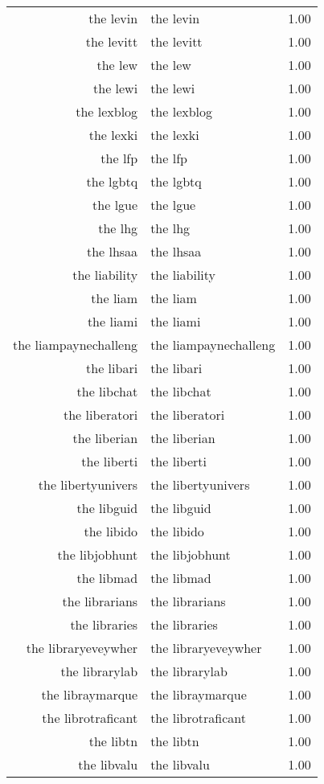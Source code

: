 \begin{table}[ht]
\begin{tabular}{rlr}
  the levin & the levin & 1.00 \\ 
  the levitt & the levitt & 1.00 \\ 
  the lew & the lew & 1.00 \\ 
  the lewi & the lewi & 1.00 \\ 
  the lexblog & the lexblog & 1.00 \\ 
  the lexki & the lexki & 1.00 \\ 
  the lfp & the lfp & 1.00 \\ 
  the lgbtq & the lgbtq & 1.00 \\ 
  the lgue & the lgue & 1.00 \\ 
  the lhg & the lhg & 1.00 \\ 
  the lhsaa & the lhsaa & 1.00 \\ 
  the liability & the liability & 1.00 \\ 
  the liam & the liam & 1.00 \\ 
  the liami & the liami & 1.00 \\ 
  the liampaynechalleng & the liampaynechalleng & 1.00 \\ 
  the libari & the libari & 1.00 \\ 
  the libchat & the libchat & 1.00 \\ 
  the liberatori & the liberatori & 1.00 \\ 
  the liberian & the liberian & 1.00 \\ 
  the liberti & the liberti & 1.00 \\ 
  the libertyunivers & the libertyunivers & 1.00 \\ 
  the libguid & the libguid & 1.00 \\ 
  the libido & the libido & 1.00 \\ 
  the libjobhunt & the libjobhunt & 1.00 \\ 
  the libmad & the libmad & 1.00 \\ 
  the librarians & the librarians & 1.00 \\ 
  the libraries & the libraries & 1.00 \\ 
  the libraryeveywher & the libraryeveywher & 1.00 \\ 
  the librarylab & the librarylab & 1.00 \\ 
  the libraymarque & the libraymarque & 1.00 \\ 
  the librotraficant & the librotraficant & 1.00 \\ 
  the libtn & the libtn & 1.00 \\ 
  the libvalu & the libvalu & 1.00 \\ 

\end{tabular}
\end{table}
